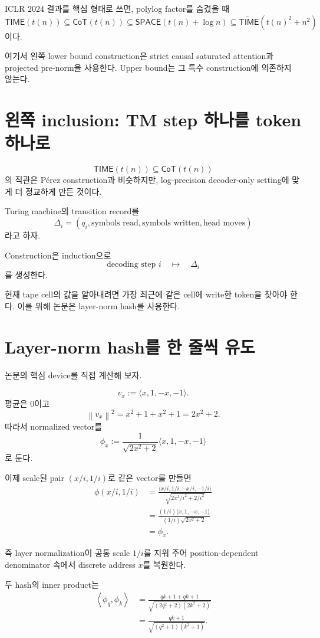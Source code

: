 \documentclass[11pt,a4paper,oneside,openany]{memoir}
\newcommand{\norm}[1]{\left\lVert #1\right\rVert}
\newcommand{\inner}[2]{\left\langle #1,#2\right\rangle}
\theoremstyle{definition}
\newcommand{\TIME}{\mathsf{TIME}}
\newcommand{\SPACE}{\mathsf{SPACE}}
\newcommand{\CoT}{\mathsf{CoT}}
\begin{document}
ICLR 2024 결과를 핵심 형태로 쓰면, polylog factor를 숨겼을 때
\[
\boxed{
\TIME(t(n))
\subseteq
\CoT(t(n))
\subseteq
\SPACE(t(n)+\log n)
\subseteq
\widetilde{\TIME}(t(n)^2+n^2)
}
\]
이다.

여기서 왼쪽 lower bound construction은 strict causal saturated attention과 projected pre-norm을 사용한다.
Upper bound는 그 특수 construction에 의존하지 않는다.

\section{왼쪽 inclusion: TM step 하나를 token 하나로}

\[
\TIME(t(n))\subseteq\CoT(t(n))
\]
의 직관은 Pérez construction과 비슷하지만, log-precision decoder-only setting에 맞게 더 정교하게 만든 것이다.

Turing machine의 transition record를
\[
\Delta_i
=
(q_i,\text{symbols read},\text{symbols written},\text{head moves})
\]
라고 하자.

Construction은 induction으로
\[
\text{decoding step }i
\quad\mapsto\quad
\Delta_i
\]
를 생성한다.

현재 tape cell의 값을 알아내려면 가장 최근에 같은 cell에 write한 token을 찾아야 한다.
이를 위해 논문은 layer-norm hash를 사용한다.

\section{Layer-norm hash를 한 줄씩 유도}

논문의 핵심 device를 직접 계산해 보자.

\[
v_x:=\langle x,1,-x,-1\rangle.
\]
평균은 0이고
\[
\norm{v_x}^2
=x^2+1+x^2+1
=2x^2+2.
\]
따라서 normalized vector를
\[
\phi_x
:=
\frac{1}{\sqrt{2x^2+2}}
\langle x,1,-x,-1\rangle
\]
로 둔다.

이제 scale된 pair $(x/i,1/i)$로 같은 vector를 만들면
\begin{align*}
\phi(x/i,1/i)
&=
\frac{\langle x/i,1/i,-x/i,-1/i\rangle}
{\sqrt{2x^2/i^2+2/i^2}}\\
&=
\frac{(1/i)\langle x,1,-x,-1\rangle}
{(1/i)\sqrt{2x^2+2}}\\
&=
\phi_x.
\end{align*}

즉 layer normalization이 공통 scale $1/i$를 지워 주어 position-dependent denominator 속에서 discrete address $x$를 복원한다.

두 hash의 inner product는
\begin{align*}
\inner{\phi_q}{\phi_k}
&=
\frac{qk+1+qk+1}
{\sqrt{(2q^2+2)(2k^2+2)}}\\
&=
\frac{qk+1}
{\sqrt{(q^2+1)(k^2+1)}}.
\end{align*}
\end{document}
